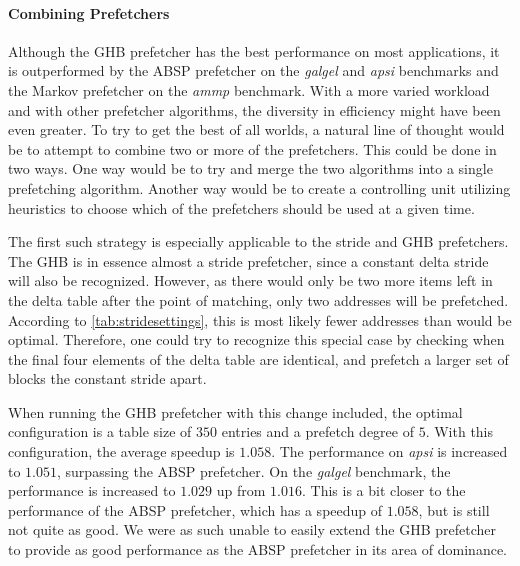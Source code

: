 \paragraph{Combining Prefetchers}
\label{par:prefcombo}
Although the GHB prefetcher has the best performance on most
applications, it is outperformed by the ABSP prefetcher on the
\emph{galgel} and \emph{apsi} benchmarks and the Markov prefetcher on
the \emph{ammp} benchmark. With a more varied workload and with other
prefetcher algorithms, the diversity in efficiency might have been
even greater. To try to get the best of all worlds, a natural line of
thought would be to attempt to combine two or more of the
prefetchers. This could be done in two ways. One way would be to try
and merge the two algorithms into a single prefetching
algorithm. Another way would be to create a controlling unit utilizing
heuristics to choose which of the prefetchers should be used at a
given time.

The first such strategy is especially applicable to the stride and GHB
prefetchers. The GHB is in essence almost a stride prefetcher, since a
constant delta stride will also be recognized. However, as there would
only be two more items left in the delta table after the point of
matching, only two addresses will be prefetched. According to
\autoref{tab:stridesettings}, this is most likely fewer addresses than
would be optimal. Therefore, one could try to recognize this special
case by checking when the final four elements of the delta table are
identical, and prefetch a larger set of blocks the constant stride
apart.

When running the GHB prefetcher with this change included, the optimal
configuration is a table size of $350$ entries and a prefetch degree
of $5$. With this configuration, the average speedup is $1.058$. The
performance on \emph{apsi} is increased to $1.051$, surpassing the ABSP
prefetcher. On the \emph{galgel} benchmark, the performance is increased to
$1.029$ up from $1.016$. This is a bit closer to the performance of
the ABSP prefetcher, which has a speedup of $1.058$, but is still not
quite as good. We were as such unable to easily extend the GHB
prefetcher to provide as good performance as the ABSP prefetcher in
its area of dominance.
